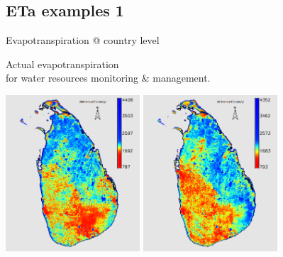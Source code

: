 \documentclass[xcolor=dvipsnames,beamer]{beamer} %
\begin{document}
\subsection{ETa examples 1}
\begin{frame}[fragile]{Evapotranspiration @ country level}

Actual evapotranspiration\\ 
for water resources monitoring \& management.\\

\begin{center}
 \includegraphics[width=5cm]{slet2005}
 \hspace{10mm}
 \includegraphics[width=5cm]{slet2010}
\end{center}

\end{frame}
\end{document}
